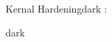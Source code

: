 \label{Kernal Hardening}
\begin{baseBoxThree}{Kernal Hardening}{dark}
    \bigskip
    :
    \bigskip
    \begin{baseBoxThree}{}{dark}

    \end{baseBoxThree}
    \smallskip
\end{baseBoxThree}
